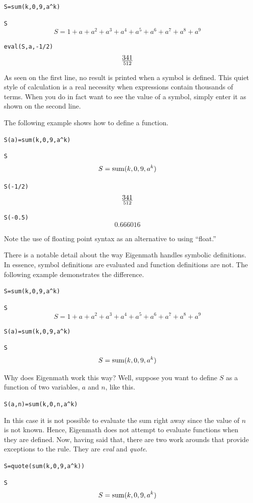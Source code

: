 \documentclass[12pt,openany]{report}
\begin{document}
\medskip
\verb$S=sum(k,0,9,a^k)$

\verb$S$
$$S=1+a+a^2+a^3+a^4+a^5+a^6+a^7+a^8+a^9$$

\verb$eval(S,a,-1/2)$
$$341\over512$$

\medskip
\noindent
As seen on the first line, no result is printed when a symbol is defined.
This quiet style of calculation is a real necessity when expressions contain
thousands of terms.
When you do in fact want to see the value of a symbol,
simply enter it as shown on the second line.

\medskip
\noindent
The following example shows how to define a function.

\medskip
\verb$S(a)=sum(k,0,9,a^k)$

\verb$S$
$$S=\mathop{\rm sum}(k,0,9,a^k)$$

\verb$S(-1/2)$
$$341\over512$$

\verb$S(-0.5)$
$$0.666016$$

\medskip
\noindent
Note the use of floating point syntax as an alternative to using ``float.''

\newpage

\noindent
There is a notable detail about the way Eigenmath handles symbolic definitions.
In essence, symbol definitions are evaluated and function definitions are not.
The following example demonstrates the difference.

\medskip
\verb$S=sum(k,0,9,a^k)$

\verb$S$
$$S=1+a+a^2+a^3+a^4+a^5+a^6+a^7+a^8+a^9$$

\verb$S(a)=sum(k,0,9,a^k)$

\verb$S$
$$S=\mathop{\rm sum}(k,0,9,a^k)$$

\medskip
\noindent
Why does Eigenmath work this way?
Well, suppose you want to define $S$ as a function of two variables, $a$ and $n$, like this.

\medskip
\verb$S(a,n)=sum(k,0,n,a^k)$

\medskip
\noindent
In this case it is not possible to evaluate the sum right away since the value of
$n$ is not known.
Hence, Eigenmath does not attempt to evaluate functions when they are defined.
Now, having said that, there are two work arounds that provide exceptions to the rule.
They are {\it eval} and {\it quote}.
 
\medskip
\verb$S=quote(sum(k,0,9,a^k))$

\verb$S$
$$S=\mathop{\rm sum}(k,0,9,a^k)$$
\end{document}
